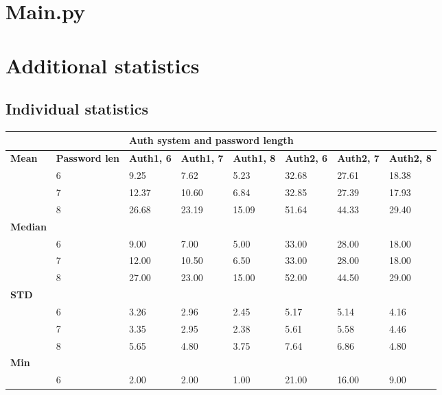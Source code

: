 \documentclass[british,10pt,a4paper]{article}
\begin{document}
\clearpage


\clearpage
\begin{appendices}

	\section{Main.py}\label{app:main}
	

	\section{Additional statistics}\label{app:extra_stats}
	\subsection{Individual statistics}
	\begin{table}[]
		\centering
		\begin{tabular}{|l|l|l|l|l|l|l|l|}
		\hline
		& & \multicolumn{6}{l|}{\textbf{Auth system and password length}} \\ \hline
		\textbf{Mean} & \textbf{Password len} & \textbf{Auth1, 6} & \textbf{Auth1, 7} & \textbf{Auth1, 8} & \textbf{Auth2, 6} & \textbf{Auth2, 7} & \textbf{Auth2, 8} \\ \hline
		 & 6 & 9.25 & 7.62 & 5.23 & 32.68 & 27.61 & 18.38 \\ \hline
		 & 7 & 12.37 & 10.60 & 6.84 & 32.85 & 27.39 & 17.93 \\ \hline
		 & 8 & 26.68 & 23.19 & 15.09 & 51.64 & 44.33 & 29.40 \\ \hline
		\textbf{Median} &  &  &  &  &  &  &  \\ \hline
		 & 6 & 9.00 & 7.00 & 5.00 & 33.00 & 28.00 & 18.00 \\ \hline
		 & 7 & 12.00 & 10.50 & 6.50 & 33.00 & 28.00 & 18.00 \\ \hline
		 & 8 & 27.00 & 23.00 & 15.00 & 52.00 & 44.50 & 29.00 \\ \hline
		\textbf{STD} &  &  &  &  &  &  &  \\ \hline
		 & 6 & 3.26 & 2.96 & 2.45 & 5.17 & 5.14 & 4.16 \\ \hline
		 & 7 & 3.35 & 2.95 & 2.38 & 5.61 & 5.58 & 4.46 \\ \hline
		 & 8 & 5.65 & 4.80 & 3.75 & 7.64 & 6.86 & 4.80 \\ \hline
		\textbf{Min} &  &  &  &  &  &  &  \\ \hline
		 & 6 & 2.00 & 2.00 & 1.00 & 21.00 & 16.00 & 9.00 \\ \hline

\end{tabular}
\end{table}
\end{appendices}
\end{document}
